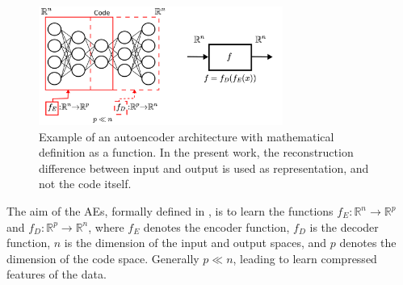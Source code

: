 \documentclass[journal,article,submit,pdftex,moreauthors]{Definitions/mdpi}
\begin{document}
\begin{figure}[H]
	\centering
	\includegraphics[width=8cm]{figures/autoencoder_methodology.pdf}
	 \caption{Example of an autoencoder architecture with mathematical definition as a function. In the present work, the reconstruction difference between input and output is used as representation, and not the code itself.}
	\label{AEs_example}      
	\centering
\end{figure}

The aim of the \ac{AEs}, formally defined in \cite{Baldi2012}, is to learn  the functions $f_{E}: \mathbb{R}^{n} \to \mathbb{R}^{p} $ and $f_{D}: \mathbb{R}^{p} \to \mathbb{R}^{n}$, where $f_{E}$ denotes the encoder function, $f_{D}$ is the decoder function, $n$ is the dimension of the input and output spaces, and $p$ denotes the dimension of the code space. Generally $p \ll n$, leading to learn compressed features of the data. 

\end{document}
